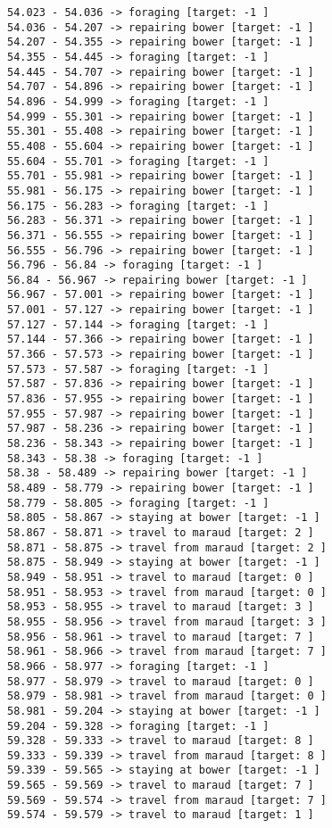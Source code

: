 \documentclass[11pt]{article}
\begin{document}
\begin{Verbatim}[commandchars=\\\{\}]
54.023 - 54.036 -> foraging [target: -1 ]
54.036 - 54.207 -> repairing bower [target: -1 ]
54.207 - 54.355 -> repairing bower [target: -1 ]
54.355 - 54.445 -> foraging [target: -1 ]
54.445 - 54.707 -> repairing bower [target: -1 ]
54.707 - 54.896 -> repairing bower [target: -1 ]
54.896 - 54.999 -> foraging [target: -1 ]
54.999 - 55.301 -> repairing bower [target: -1 ]
55.301 - 55.408 -> repairing bower [target: -1 ]
55.408 - 55.604 -> repairing bower [target: -1 ]
55.604 - 55.701 -> foraging [target: -1 ]
55.701 - 55.981 -> repairing bower [target: -1 ]
55.981 - 56.175 -> repairing bower [target: -1 ]
56.175 - 56.283 -> foraging [target: -1 ]
56.283 - 56.371 -> repairing bower [target: -1 ]
56.371 - 56.555 -> repairing bower [target: -1 ]
56.555 - 56.796 -> repairing bower [target: -1 ]
56.796 - 56.84 -> foraging [target: -1 ]
56.84 - 56.967 -> repairing bower [target: -1 ]
56.967 - 57.001 -> repairing bower [target: -1 ]
57.001 - 57.127 -> repairing bower [target: -1 ]
57.127 - 57.144 -> foraging [target: -1 ]
57.144 - 57.366 -> repairing bower [target: -1 ]
57.366 - 57.573 -> repairing bower [target: -1 ]
57.573 - 57.587 -> foraging [target: -1 ]
57.587 - 57.836 -> repairing bower [target: -1 ]
57.836 - 57.955 -> repairing bower [target: -1 ]
57.955 - 57.987 -> repairing bower [target: -1 ]
57.987 - 58.236 -> repairing bower [target: -1 ]
58.236 - 58.343 -> repairing bower [target: -1 ]
58.343 - 58.38 -> foraging [target: -1 ]
58.38 - 58.489 -> repairing bower [target: -1 ]
58.489 - 58.779 -> repairing bower [target: -1 ]
58.779 - 58.805 -> foraging [target: -1 ]
58.805 - 58.867 -> staying at bower [target: -1 ]
58.867 - 58.871 -> travel to maraud [target: 2 ]
58.871 - 58.875 -> travel from maraud [target: 2 ]
58.875 - 58.949 -> staying at bower [target: -1 ]
58.949 - 58.951 -> travel to maraud [target: 0 ]
58.951 - 58.953 -> travel from maraud [target: 0 ]
58.953 - 58.955 -> travel to maraud [target: 3 ]
58.955 - 58.956 -> travel from maraud [target: 3 ]
58.956 - 58.961 -> travel to maraud [target: 7 ]
58.961 - 58.966 -> travel from maraud [target: 7 ]
58.966 - 58.977 -> foraging [target: -1 ]
58.977 - 58.979 -> travel to maraud [target: 0 ]
58.979 - 58.981 -> travel from maraud [target: 0 ]
58.981 - 59.204 -> staying at bower [target: -1 ]
59.204 - 59.328 -> foraging [target: -1 ]
59.328 - 59.333 -> travel to maraud [target: 8 ]
59.333 - 59.339 -> travel from maraud [target: 8 ]
59.339 - 59.565 -> staying at bower [target: -1 ]
59.565 - 59.569 -> travel to maraud [target: 7 ]
59.569 - 59.574 -> travel from maraud [target: 7 ]
59.574 - 59.579 -> travel to maraud [target: 1 ]

\end{Verbatim}
\end{document}
